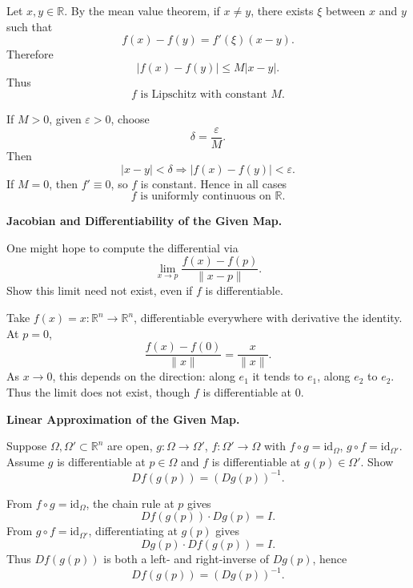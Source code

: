 \begin{solution}
Let \(x,y\in\mathbb R\). By the mean value theorem, if \(x\neq y\), there exists
\(\xi\) between \(x\) and \(y\) such that
\[
f(x)-f(y)=f'(\xi)(x-y).
\]
Therefore
\[
|f(x)-f(y)|
\le
M|x-y|.
\]
Thus
\[
\boxed{f\text{ is Lipschitz with constant }M.}
\]

If \(M>0\), given \(\varepsilon>0\), choose
\[
\delta=\frac{\varepsilon}{M}.
\]
Then
\[
|x-y|<\delta
\Longrightarrow
|f(x)-f(y)|<\varepsilon.
\]
If \(M=0\), then \(f'\equiv0\), so \(f\) is constant. Hence in all cases
\[
\boxed{f\text{ is uniformly continuous on }\mathbb R.}
\]
\end{solution}


\begin{problem}[CP-II-0528]
\label{prob:cp-ii-0528}
\textbf{Jacobian and Differentiability of the Given Map.}

\hspace*{1.5em}One might hope to compute the differential via
\[
\lim_{x\to p}\frac{f(x)-f(p)}{\|x-p\|}.
\]
Show this limit need not exist, even if $f$ is differentiable.
\end{problem}

\begin{solution}
Take $f(x)=x:\mathbb{R}^n\to\mathbb{R}^n$, differentiable everywhere with derivative the identity.
	At $p=0$,
	\[
	\frac{f(x)-f(0)}{\|x\|}=\frac{x}{\|x\|}.
	\]
	As $x\to 0$, this depends on the direction: along $e_1$ it tends to $e_1$, along $e_2$ to $e_2$.
	Thus the limit does not exist, though $f$ is differentiable at $0$.
\end{solution}

\begin{problem}[CP-II-0535]
\label{prob:cp-ii-0535}
\textbf{Linear Approximation of the Given Map.}

\hspace*{1.5em}Suppose $\Omega,\Omega'\subset\mathbb{R}^n$ are open, $g:\Omega\to\Omega'$, $f:\Omega'\to\Omega$ with $f\circ g=\mathrm{id}_\Omega$, $g\circ f=\mathrm{id}_{\Omega'}$. Assume $g$ is differentiable at $p\in\Omega$ and $f$ is differentiable at $g(p)\in\Omega'$. Show
\[
Df(g(p))=(Dg(p))^{-1}.
\]
\end{problem}

\begin{solution}
From $f\circ g=\mathrm{id}_\Omega$, the chain rule at $p$ gives
	\[
	Df(g(p))\cdot Dg(p)=I.
	\]
	From $g\circ f=\mathrm{id}_{\Omega'}$, differentiating at $g(p)$ gives
	\[
	Dg(p)\cdot Df(g(p))=I.
	\]
	Thus $Df(g(p))$ is both a left- and right-inverse of $Dg(p)$, hence
	\[
	Df(g(p))=(Dg(p))^{-1}.
	\]
\end{solution}

